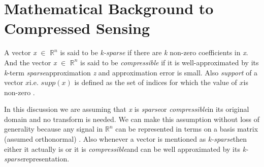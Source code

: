 \documentclass[12pt]{article}
\theoremstyle{definition}
\newtheorem{defn}{Definition}[section]
\def\compressible{\textit{compressible}\hspace{0.1in}}
\def\sparse{\textit{sparse}\hspace{0.1in}}
\def\ksparse{\textit{k-sparse}\hspace{0.1in}}
\def\x{$x$\hspace{0.1in}}
\begin{document}
\section{Mathematical Background to Compressed Sensing}
% 
 A vector \textit{x} $\in$ $\mathbb{R}^n$ is said to be \textit{k-sparse} if there are \textit{k} 
 non-zero coefficients in \textit{x}. 
 And the vector \textit{x} $\in$ $\mathbb{R}^n$ is said to be \textit{compressible} if it is well-approximated by its
\textit{k}-term \sparse approximation \textit{z} and approximation error is small. Also
\textit{support} of a vector \x i.e. $supp(x)$ is defined as the set of indices for which the value of \x is
non-zero \cite{CS_book}.

In this discussion we are assuming that \textit{x} is \sparse or \compressible in its original domain and no transform
is needed. We can make this assumption without loss of generality because any signal in $\mathbb{R}^n$ can be 
represented in terms on a basis matrix (assumed orthonormal) \cite{Baraniuk-CS}.
Also whenever a vector is mentioned as \ksparse then either it actually is or it is \compressible and can be well approximated 
by its \ksparse representation.
\end{document}
